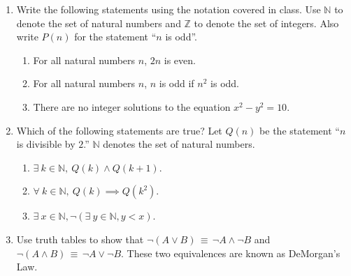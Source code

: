 \documentclass[11pt]{article}
\begin{document}
\maketitle

\begin{enumerate}

\item Write the following statements using the notation covered in class. Use $\mathbb{N}$ to denote the set of natural numbers and $\mathbb{Z}$ to denote the
set of integers.  Also write $P(n)$ for the statement ``$n$ is odd''.
\begin{enumerate}
\item For all natural numbers $n$, $2n$ is even. \\
{}
\item For all natural numbers $n$, $n$ is odd if $n^2$ is odd. \\
{}
\item There are no integer solutions to the equation $x^2 - y^2 = 10$. \\
{}
\end{enumerate}



\item Which of the following statements are true? Let $Q(n)$
  be the statement ``$n$ is divisible by $2$.''  $\mathbb{N}$ denotes the
  set of natural numbers.
  \begin{enumerate}
    \item $\exists \ k\in \mathbb{N}, \ Q(k) \wedge Q(k+1)$.
    \item $\forall \ k\in \mathbb{N}, \ Q(k)\implies Q(k^2)$.
    \item $\exists \ x\in \mathbb{N}, \neg(\exists \ y\in \mathbb{N}, y < x)$.
  \end{enumerate}

{\color{blue}{(a) false, (b) true, (c) true}}

\item Use truth tables to show that $\neg (A\vee B) \,\equiv\, \neg A
\wedge \neg B$ and $\neg (A\wedge B) \,\equiv\, \neg A \vee \neg
B$. These two equivalences are known as DeMorgan's Law.


\begin{table}[h!]
\center
{}
\end{table}



\end{enumerate}
\end{document}
